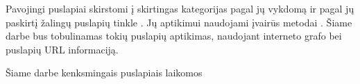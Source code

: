 Pavojingi puslapiai skirstomi į skirtingas kategorijas pagal jų vykdomą \cite{tax} ir pagal jų paskirtį žalingų puslapių tinkle \cite{linchpins}. Jų aptikimui naudojami įvairūs metodai \cite{comp}. Šiame darbe bus tobulinamas tokių puslapių aptikimas, naudojant interneto grafo bei puslapių URL informaciją.

Šiame darbe kenksmingais puslapiais laikomos